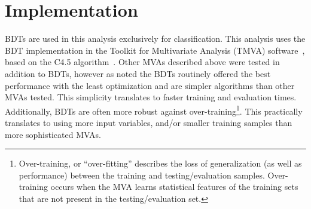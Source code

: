 


\section{Implementation}
BDTs are used in this analysis exclusively for classification.
This analysis uses the BDT implementation in the Toolkit for Multivariate Analysis (TMVA) software~\cite{tmva}, based on the
C4.5 algorithm~\cite{C4.5}. Other MVAs described above were tested in addition to BDTs, however as noted the BDTs routinely offered the
best performance with the least optimization and are simpler algorithms than other MVAs tested.
This simplicity translates to faster training and evaluation times.
Additionally, BDTs are often more robust against over-training\footnote{Over-training, or ``over-fitting'' describes the loss of generalization (as well as performance)
between the training and testing/evaluation samples. Over-training occurs when the MVA learns statistical features of the training sets that are not present in
the testing/evaluation set.}. This practically translates to using more input variables, and/or smaller training samples than more sophisticated MVAs.

